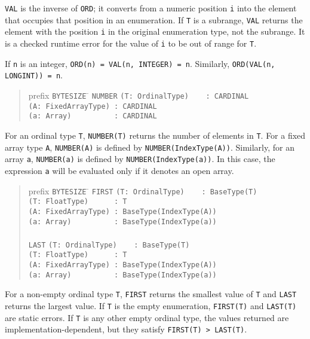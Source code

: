 \documentclass[10pt]{article}
\begin{document}
\verb|VAL| is the inverse of \verb|ORD|; it converts from a numeric position
\verb|i| into the element that occupies that position in an enumeration.  If
\verb|T| is a subrange, \verb|VAL| returns the element with the position
\verb|i| in the original enumeration type, not the subrange.  It is a checked
runtime error for the value of \verb|i| to be out of range for \verb|T|.

If \verb|n| is an integer, \verb|ORD(n) = VAL(n, INTEGER) = n|.  Similarly,
\verb|ORD(VAL(n, LONGINT)) = n|.

\begin{quote}
  \begin{tabbing}
    prefix \= \verb|BYTESIZE| \= \kill
           \> \verb|NUMBER| \> \verb|(T: OrdinalType)    : CARDINAL| \\
           \>               \> \verb|(A: FixedArrayType) : CARDINAL| \\
           \>               \> \verb|(a: Array)          : CARDINAL|
  \end{tabbing}
\end{quote}
For an ordinal type \verb|T|, \verb|NUMBER(T)| returns the number of elements
in \verb|T|.  For a fixed array type \verb|A|, \verb|NUMBER(A)| is defined by
\verb|NUMBER(IndexType(A))|.  Similarly, for an array \verb|a|,
\verb|NUMBER(a)| is defined by \verb|NUMBER(IndexType(a))|.  In this case, the
expression \verb|a| will be evaluated only if it denotes an open array.

\begin{quote}
  \begin{tabbing}
    prefix \= \verb|BYTESIZE| \= \kill
    \> \verb|FIRST| \> \verb|(T: OrdinalType)    : BaseType(T)| \\
    \>              \> \verb|(T: FloatType)      : T| \\
    \>              \> \verb|(A: FixedArrayType) : BaseType(IndexType(A))| \\
    \>              \> \verb|(a: Array)          : BaseType(IndexType(a))| \\
    \\
    \> \verb|LAST|  \> \verb|(T: OrdinalType)    : BaseType(T)| \\
    \>              \> \verb|(T: FloatType)      : T| \\
    \>              \> \verb|(A: FixedArrayType) : BaseType(IndexType(A))| \\
    \>              \> \verb|(a: Array)          : BaseType(IndexType(a))|
  \end{tabbing}
\end{quote}
For a non-empty ordinal type \verb|T|, \verb|FIRST| returns the smallest value
of \verb|T| and \verb|LAST| returns the largest value.  If \verb|T| is the
empty enumeration, \verb|FIRST(T)| and \verb|LAST(T)| are static errors.  If
\verb|T| is any other empty ordinal type, the values returned are
implementation-dependent, but they satisfy \verb|FIRST(T) > LAST(T)|.
\end{document}
